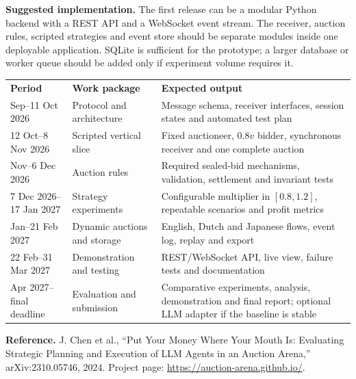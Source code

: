 \documentclass[10pt]{article}
\newcommand{\sectiontitle}[1]{%
  \vspace{3pt}{\large\bfseries #1}\par\vspace{1pt}}
\begin{document}
\textbf{Suggested implementation.} The first release can be a modular Python backend with a REST API and a WebSocket event stream. The receiver, auction rules, scripted strategies and event store should be separate modules inside one deployable application. SQLite is sufficient for the prototype; a larger database or worker queue should be added only if experiment volume requires it.

\sectiontitle{Proposed Timeline}
\begin{tabularx}{\textwidth}{>{\raggedright\arraybackslash}p{1.35in} >{\raggedright\arraybackslash}p{1.65in} X}
\rowcolor{navy}
\color{white}\bfseries Period & \color{white}\bfseries Work package & \color{white}\bfseries Expected output \\
24 Sep--11 Oct 2026 & Protocol and architecture & Message schema, receiver interfaces, session states and automated test plan \\
\rowcolor{lightgray}
12 Oct--8 Nov 2026 & Scripted vertical slice & Fixed auctioneer, $0.8v$ bidder, synchronous receiver and one complete auction \\
9 Nov--6 Dec 2026 & Auction rules & Required sealed-bid mechanisms, validation, settlement and invariant tests \\
\rowcolor{lightgray}
7 Dec 2026--17 Jan 2027 & Strategy experiments & Configurable multiplier in $[0.8,1.2]$, repeatable scenarios and profit metrics \\
18 Jan--21 Feb 2027 & Dynamic auctions and storage & English, Dutch and Japanese flows, event log, replay and export \\
\rowcolor{lightgray}
22 Feb--31 Mar 2027 & Demonstration and testing & REST/WebSocket API, live view, failure tests and documentation \\
1 Apr 2027--final deadline & Evaluation and submission & Comparative experiments, analysis, demonstration and final report; optional LLM adapter if the baseline is stable \\
\end{tabularx}

\vspace{4pt}
\textbf{Reference.} J. Chen et al., ``Put Your Money Where Your Mouth Is: Evaluating Strategic Planning and Execution of LLM Agents in an Auction Arena,'' arXiv:2310.05746, 2024. Project page: \url{https://auction-arena.github.io/}.
\end{document}
